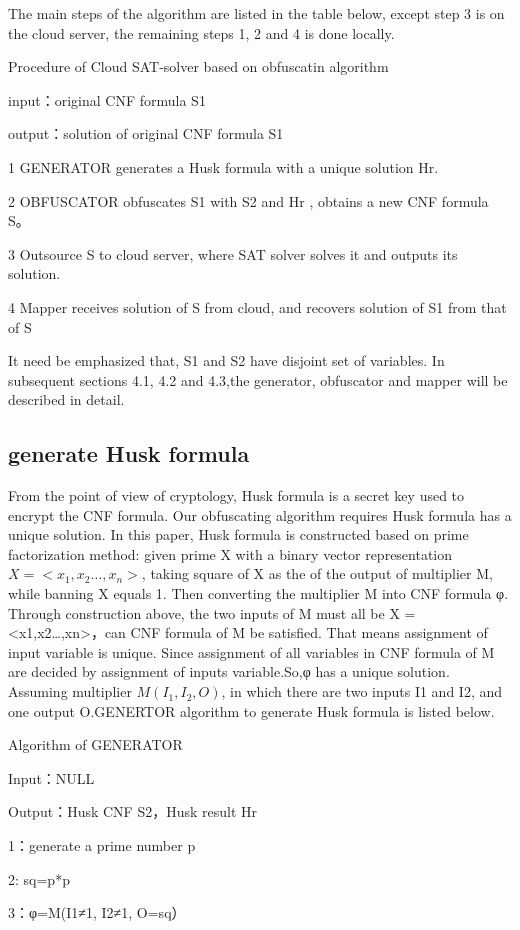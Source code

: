 \documentclass[runningheads,a4paper]{llncs}
\begin{document}
The main steps of the algorithm are listed in the table below, except step 3 is on the cloud server, the remaining steps 1, 2 and 4 is done locally.

\noindent Procedure of Cloud SAT-solver based on obfuscatin algorithm

input：original CNF formula S1 

output：solution of original CNF formula S1

1 GENERATOR generates a Husk formula with a unique solution Hr.

2 OBFUSCATOR obfuscates S1 with S2 and Hr , obtains a new CNF formula S。

3 Outsource S to cloud server, where SAT solver solves it and outputs its solution. 

4 Mapper receives solution of S from cloud, and recovers solution of S1 from that of S 

It need be emphasized that, S1 and S2 have disjoint set of variables. In subsequent sections 4.1, 4.2 and 4.3,the generator, obfuscator and mapper will be described in detail. 
\subsection{generate Husk formula}
From the point of view of cryptology, Husk formula is a secret key used to encrypt the CNF formula. 
Our obfuscating algorithm requires Husk formula has a unique solution.
In this paper, Husk formula is constructed based on prime factorization method:
given prime X with a binary vector representation $X = <x_1,x_2…,x_n>$, 
taking square of X as the of the output of multiplier M, while banning X equals 1.
Then converting the multiplier M into CNF formula φ.
Through construction above, the two inputs of M must all be X = <x1,x2…,xn>，can CNF formula of M be satisfied.
That means assignment of input variable is unique.
Since assignment of all variables in CNF formula of M are decided by assignment of inputs variable.So,φ has a unique solution. 
Assuming multiplier $M (I_1, I_2, O)$, in which there are two inputs I1 and I2, and one output O.GENERTOR algorithm to generate Husk formula is listed below.

\noindent Algorithm of GENERATOR

Input：NULL

Output：Husk CNF S2，Husk result Hr

1：generate a prime number p

2: sq=p*p

3：φ=M(I1≠1, I2≠1, O=sq）
\end{document}
